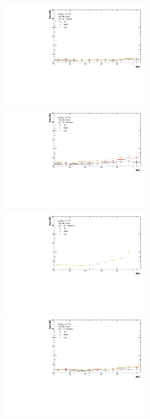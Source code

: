 \documentclass[ALICE]{ALICE_analysis_notes}
\begin{document}
\begin{figure}[h!]
    \centering
    \begin{multicols}{2}
            \includegraphics[width=7.5cm]{figures/TriggerBias/NEF/hNEF_ptBin0_R02.pdf}
            \includegraphics[width=7.5cm]{figures/TriggerBias/NEF/hNEF_ptBin2_R02.pdf}
            \includegraphics[width=7.5cm]{figures/TriggerBias/NEF/hNEF_ptBin4_R02.pdf}
        \vfill\null
        \columnbreak
            \includegraphics[width=7.5cm]{figures/TriggerBias/NEF/hNEF_ptBin1_R02.pdf}

\end{multicols}
\end{figure}
\end{document}
